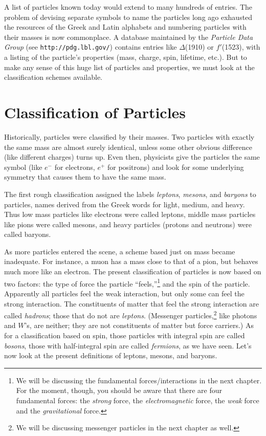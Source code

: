 A list of particles known today would extend to many hundreds of
entries.  The problem of devising separate symbols to name the
particles long ago exhausted the resources of the Greek and Latin
alphabets and numbering particles with their masses is now
commonplace.  A database maintained by the \textit{Particle Data
Group} (see \verb+http://pdg.lbl.gov/+)  contains entries 
like $\Delta$(1910) or $f'$(1523), with a listing of the particle's 
properties (mass, charge, spin, lifetime,
etc.).  But to make any sense of this huge list of particles and
properties, we must look at the classification schemes available.

\section{Classification of Particles}

Historically, particles were classified by their masses.  Two
particles with exactly the same mass are almost surely identical,
unless some other obvious difference (like different charges)
turns up. Even then, physicists give the particles the same symbol
(like $e^-$ for electrons, $e^+$ for positrons) and look for some
underlying symmetry that causes them to have the same mass.

The first rough classification assigned the labels {\em leptons}, {\em
mesons}, and {\em baryons} to particles, names derived from the Greek
words for light, medium, and heavy.  Thus low mass particles like
electrons were called leptons, middle mass particles like pions were
called mesons, and heavy particles (protons and neutrons) were called
baryons.

As more particles entered the scene, a scheme based just on mass
became inadequate.  For instance, a muon has a mass close to that
of a pion, but behaves much more like an electron.  The present
classification of particles is now based on two factors: the type
of force the particle ``feels,''\footnote{We will be discussing
the fundamental forces/interactions in the next chapter.  For the
moment, though, you should be aware that there are four
fundamental forces: the \textit{strong} force, the
\textit{electromagnetic} force, the \textit{weak} force and the
\textit{gravitational} force.} and the spin of the particle. Apparently
all particles feel the weak interaction, but only some can feel
the strong interaction. The constituents of matter that feel the
strong interaction are called {\em hadrons}; those that do not are
{\em leptons}.  (Messenger particles,\footnote{We will be
discussing messenger particles in the next chapter as well.} like
photons and $W$'s, are neither; they are not constituents of
matter but force carriers.) As for a classification based on spin,
those particles with integral spin are called {\em bosons}, those
with half-integral spin are called {\em fermions}, as we have
seen. Let's now look at the present definitions of leptons,
mesons, and baryons.

